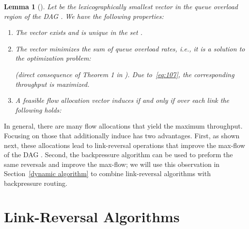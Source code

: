 \documentclass{sig-alternate-2013}
\newtheorem{lemma}{Lemma}
\begin{document}
\begin{lemma}[\cite{georgiadis}] \label{lem:201}
Let  be the lexicographically smallest vector in the queue overload region  of the DAG . We have the following properties:
\begin{enumerate}
\itemsep0em 
\item The vector  exists and is unique in the set .
\item The vector  minimizes the sum of queue overload rates, i.e., it is a solution to the optimization problem:

(direct consequence of Theorem 1 in \cite{georgiadis}). Due to~\eqref{eq:107}, the corresponding throughput is maximized.
\item  A feasible flow allocation vector  induces  if and only if over each link  the following holds:
 
\end{enumerate}

\end{lemma}

In general, there are many flow allocations that yield the maximum throughput. Focusing on those that additionally induce  has two advantages. First, as  shown next, these allocations lead to link-reversal operations that improve the max-flow of the DAG . Second, the backpressure algorithm can be used to preform the same reversals and improve the max-flow; we will use this observation in Section~\ref{dynamic algorithm} to combine link-reversal algorithms with backpressure routing.



\section{Link-Reversal Algorithms} \label{sec:link_reversal}
\end{document}
